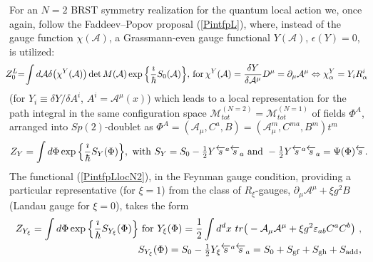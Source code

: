 \documentclass[10pt]{article}
\begin{document}
For an $N=2$ BRST symmetry realization for the quantum local action we, once again,
follow the Faddeev--Popov proposal (\ref{PintfpL}), where, instead of the gauge function
$\chi(\mathcal{A})$, a Grassmann-even gauge functional $Y(\mathcal{A})$, $\epsilon(Y)=0$,
is utilized:
  \begin{eqnarray}\label{N2lqact}
  &\hspace{-1em}&\hspace{-0.5em} Z^L_{0}\hspace{-0.3em} =\hspace{-0.2em} \int  d \mathcal{A} \delta\big( \chi^Y(\mathcal{A})\big)\det M(\mathcal{A}) \exp\Big\{\frac{\imath}{\hbar}S_0(\mathcal{A})\Big\}, \, \mathrm{for} \,
  \chi^Y(\mathcal{A})=   \frac{\delta Y}{\delta \mathcal{A}^\mu}D^\mu = \partial_\mu \mathcal{A}^\mu \Leftrightarrow  \chi^Y_\alpha  =   Y_i R^i_\alpha
\end{eqnarray}
(for $Y_i \equiv  \delta Y / \delta A^i $, $A^i=\mathcal{A}^\mu(x)$) which leads to a local representation for the path integral in the same configuration space
$\mathcal{M}_{t ot}^{(N=2)}=\mathcal{M}_{t ot}^{(N=1)}$ of fields $\Phi^A$, arranged into $Sp(2)$-doublet as
$\Phi^A=(\mathcal{A}_\mu, C^a, B)= (\mathcal{A}_\mu^m, C^{m{}a}, B^m)t^m$
\begin{eqnarray}
\label{PintfpLlocN2}
&\hspace{-1em}& Z_Y =  \int  d \Phi   \exp \Big\{\frac{\imath}{\hbar}S_Y(\Phi)\Big\}, \ \mathrm{with}  \ S_Y  = S_0-\textstyle\frac{1}{2}%
Y\overleftarrow{s}{}^a\overleftarrow{s}{}_a \  \mathrm{and} \ -\textstyle\frac{1}{2}%
Y\overleftarrow{s}{}^a\overleftarrow{s}{}_a   =  \Psi(\Phi) \overleftarrow{s}.
\end{eqnarray}
The functional (\ref{PintfpLlocN2}), in the Feynman gauge condition, providing a particular representative
(for $\xi=1$) from the class of $R_\xi$-gauges, $\partial_\mu \mathcal{A}^\mu + {\xi g^2}B$
(Landau gauge for $\xi=0$), takes the form
\begin{eqnarray}
\hspace{-0.5em} &\hspace{-0.5em}&
Z_{Y_\xi} =  \int  d \Phi   \exp \Big\{\frac{\imath}{\hbar}S_{Y_\xi}(\Phi)\Big\} \ \mathrm{for} \  Y_{\xi }(\Phi )= \frac{1}{2}\int
d^{d}x\ tr \big(-\mathcal{ A}_{\mu }\mathcal{A}^{\mu }+{\xi g^2 }\varepsilon
_{ab}C^{a}C^{b}\big)\ ,  \label{Y(A,C)} \\
\hspace{-0.5em} &\hspace{-0.5em}& \label{SY(A,C)}
S_{Y_\xi}(\Phi) = S_0-\textstyle\frac{1}{2}%
Y_\xi\overleftarrow{s}{}^a\overleftarrow{s}{}_a = S_0+S_{\mathrm{gf}} +  S_{\mathrm{gh}}+  S_{\mathrm{add}} ,
\end{eqnarray}
\end{document}
